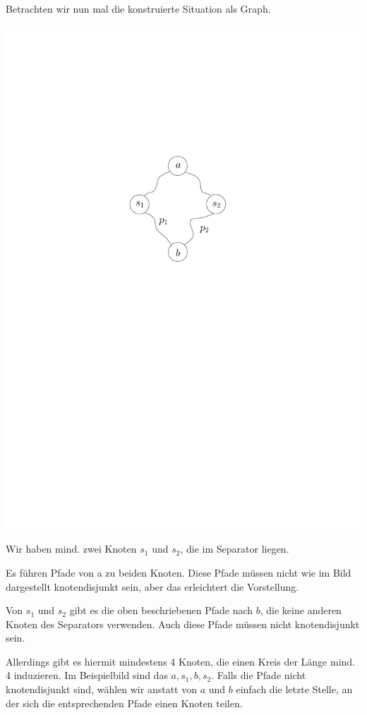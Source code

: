 Betrachten wir nun mal die konstruierte Situation als Graph.

\begin{center}
    \vspace{1ex}
    \includegraphics[page=1]{fig/03-2a-pfade}
\end{center}

Wir haben mind. zwei Knoten $s_1$ und $s_2$, die im Separator liegen.

Es führen Pfade von a zu beiden Knoten. Diese Pfade müssen nicht wie im Bild dargestellt knotendisjunkt sein, aber das erleichtert die Vorstellung.

Von $s_1$ und $s_2$ gibt es die oben beschriebenen Pfade nach $b$, die keine anderen Knoten des Separators verwenden. Auch diese Pfade müssen nicht knotendisjunkt sein.

Allerdings gibt es hiermit mindestens 4 Knoten, die einen Kreis der Länge mind. 4 induzieren. Im Beispielbild sind das $a, s_1, b, s_2$. Falls die Pfade nicht knotendisjunkt sind, wählen wir anstatt von $a$ und $b$ einfach die letzte Stelle, an der sich die entsprechenden Pfade einen Knoten teilen.


